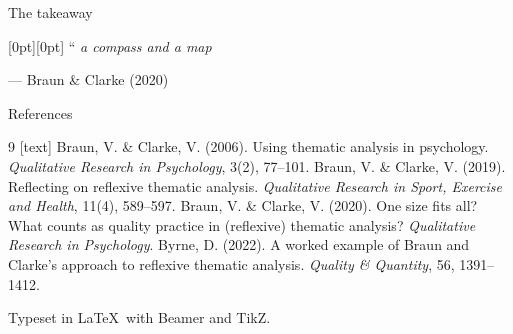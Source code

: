 \documentclass[aspectratio=169,11pt,t]{beamer}
\newenvironment{pullquote}[1][]
  {\def\pqsource{#1}%
   \begin{center}\begin{minipage}{0.82\textwidth}
   \setlength{\leftskip}{1.1cm}%
   \noindent\hspace*{-1.1cm}%
   \raisebox{-0.42\height}[0pt][0pt]{%
     \color{ochre}\headingfont\fontsize{56}{56}\selectfont\textquotedblleft}%
   \hspace{0.18cm}%
   \color{ink}\headingfont\fontsize{17}{23}\selectfont\itshape\ignorespaces}
  {\par\vspace{0.5em}%
   \normalfont\footnotesize\color{mute}\hfill--- \pqsource
   \end{minipage}\end{center}}
\begin{document}
\begin{frame}{The takeaway}
\vspace{1.2em}
\begin{pullquote}[Braun \& Clarke (2020)]
a compass and a map
\end{pullquote}
\vspace{0.4em}
\begin{center}
\end{center}
\end{frame}

\begin{frame}{References}
\vspace{0.4em}
{\footnotesize
\begin{thebibliography}{9}
[text]
 Braun, V. \& Clarke, V. (2006). Using thematic analysis in
  psychology. \emph{Qualitative Research in Psychology}, 3(2), 77--101.
 Braun, V. \& Clarke, V. (2019). Reflecting on reflexive
  thematic analysis. \emph{Qualitative Research in Sport, Exercise and
  Health}, 11(4), 589--597.
 Braun, V. \& Clarke, V. (2020). One size fits all? What
  counts as quality practice in (reflexive) thematic analysis?
  \emph{Qualitative Research in Psychology}.
 Byrne, D. (2022). A worked example of Braun and Clarke's
  approach to reflexive thematic analysis. \emph{Quality \& Quantity},
  56, 1391--1412.
\end{thebibliography}}
\vspace{0.6em}
\begin{center}{\color{mute}\scriptsize
 Typeset in \LaTeX\ with Beamer and TikZ.}\end{center}
\end{frame}
\end{document}
